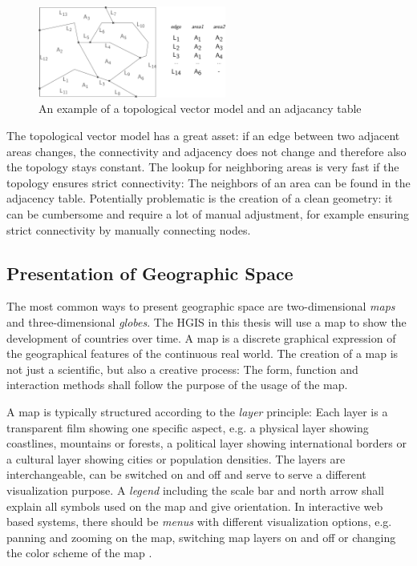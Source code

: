 \begin{figure}[ht]
  \centering
  \includegraphics[width=0.55\textwidth]{graphics/basics/topological_vector_model}
  \caption{An example of a topological vector model and an adjacancy table}
  \label{fig:topological_vector_model}
\end{figure}

The topological vector model has a great asset: if an edge between two adjacent areas changes, the connectivity and adjacency does not change and therefore also the topology stays constant. The lookup for neighboring areas is very fast if the topology ensures strict connectivity: The neighbors of an area can be found in the adjacency table. Potentially problematic is the creation of a clean geometry: it can be cumbersome and require a lot of manual adjustment, for example ensuring strict connectivity by manually connecting nodes.



\subsection{Presentation of Geographic Space} %
\label{sub:presentation_of_geographic_space}

The most common ways to present geographic space are two-dimensional \emph{maps} and three-dimensional \emph{globes}. The HGIS in this thesis will use a map to show the development of countries over time. A map is a discrete graphical expression of the geographical features of the continuous real world. The creation of a map is not just a scientific, but also a creative process: The form, function and interaction methods shall follow the purpose of the usage of the map.

A map is typically structured according to the \emph{layer} principle: Each layer is a transparent film showing one specific aspect, e.g. a physical layer showing coastlines, mountains or forests, a political layer showing international borders or a cultural layer showing cities or population densities. The layers are interchangeable, can be switched on and off and serve to serve a different visualization purpose. A \emph{legend} including the scale bar and north arrow shall explain all symbols used on the map and give orientation. In interactive web based systems, there should be \emph{menus} with different visualization options, e.g. panning and zooming on the map, switching map layers on and off or changing the color scheme of the map
\cite[pp. 159-166]{bolstad2008gis}.


